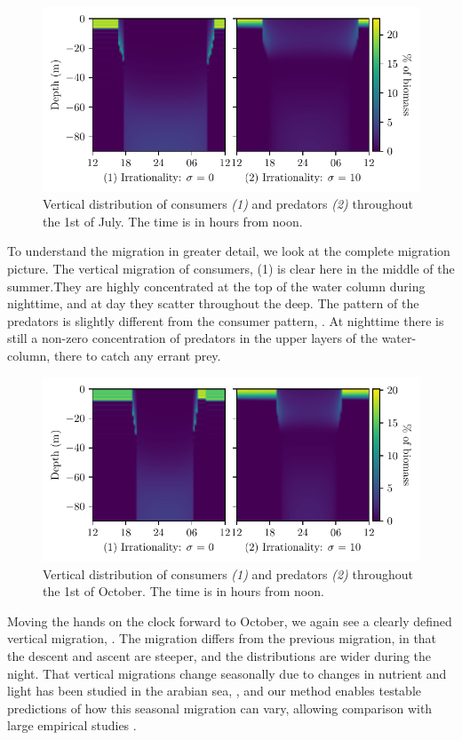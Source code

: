\begin{figure}[H]
\includegraphics{plots/heatmapsday90_nonrandom.pdf}
\caption{Vertical distribution of consumers \emph{(1)} and predators \emph{(2)} throughout the 1st of July. The time is in hours from noon. }
\label{fig:heatmaps_90_nonrandom}
\end{figure}
To understand the migration in greater detail, we look at the complete migration picture.
The vertical migration of consumers, (1) is clear here in the middle of the summer.They are highly concentrated at the top of the water column during nighttime, and at day they scatter throughout the deep. The pattern of the predators is slightly different from the consumer pattern, . At nighttime there is still a non-zero concentration of predators in the upper layers of the water-column, there to catch any errant prey.
\begin{figure}[H]
\includegraphics{plots/heatmapsday180_nonrandom.pdf}
\caption{Vertical distribution of consumers \emph{(1)} and predators \emph{(2)} throughout the 1st of October. The time is in hours from noon.}
\label{fig:heatmaps_180_nonrandom}
\end{figure}
Moving the hands on the clock forward to October, we again see a clearly defined vertical migration, . The migration differs from the previous migration, in that the descent and ascent are steeper, and the distributions are wider during the night. That vertical migrations change seasonally due to changes in nutrient and light has been studied in the arabian sea, \citep{wang2014seasonal}, and our method enables testable predictions of how this seasonal migration can vary, allowing comparison with large empirical studies \citep{klevjer2016large}.

